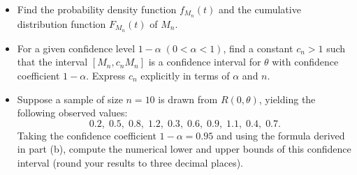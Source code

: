 \documentclass[10pt]{article}
\begin{document}
\begin{enumerate}
\begin{itemize}
\item[(a)]  Find the probability density function \( f_{M_n}(t) \) and the cumulative distribution function \( F_{M_n}(t) \) of \( M_n \).
\item[(b)]  For a given confidence level \( 1-\alpha \; (0 < \alpha < 1) \), find a constant \( c_n > 1 \) such that the interval \([M_n,c_n M_n]\) is a confidence interval for \( \theta \) with confidence coefficient \( 1-\alpha \). Express \( c_n \) explicitly in terms of \( \alpha \) and \( n \).
\item[(c)]  Suppose a sample of size \( n = 10 \) is drawn from \( R(0, \theta) \), yielding the following observed values:
\[
0.2,\; 0.5,\; 0.8,\; 1.2,\; 0.3,\; 0.6,\; 0.9,\; 1.1,\; 0.4,\; 0.7.
\]
Taking the confidence coefficient \( 1-\alpha = 0.95 \) and using the formula derived in part (b), compute the numerical lower and upper bounds of this confidence interval (round your results to three decimal places).
\end{itemize}


\end{enumerate}
\end{document}

